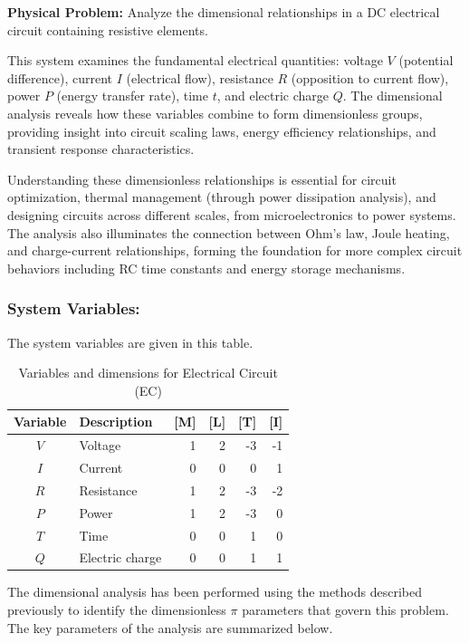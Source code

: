 \begin{problembox}
\textbf{Physical Problem:} Analyze the dimensional relationships in a DC electrical circuit containing resistive elements.
\end{problembox}
\begin{codebox}
This system examines the fundamental electrical quantities: voltage $V$ (potential difference), current $I$ (electrical flow), resistance $R$ (opposition to current flow), power $P$ (energy transfer rate), time $t$, and electric charge $Q$. The dimensional analysis reveals how these variables combine to form dimensionless groups, providing insight into circuit scaling laws, energy efficiency relationships, and transient response characteristics.

Understanding these dimensionless relationships is essential for circuit optimization, thermal management (through power dissipation analysis), and designing circuits across different scales, from microelectronics to power systems. The analysis also illuminates the connection between Ohm's law, Joule heating, and charge-current relationships, forming the foundation for more complex circuit behaviors including RC time constants and energy storage mechanisms.
\end{codebox}

\subsubsection*{System Variables: } The system variables are given in this table.

\begin{table}[htpb]
\centering
\begin{tabular}{|c|l|r|r|r|r|}
\hline
\textbf{Variable} & \textbf{Description} & \textbf{[M]} & \textbf{[L]} & \textbf{[T]} & \textbf{[I]} \\
\hline
$V$ & Voltage & 1 & 2 & -3 & -1 \\
$I$ & Current & 0 & 0 & 0 & 1 \\
$R$ & Resistance & 1 & 2 & -3 & -2 \\
$P$ & Power & 1 & 2 & -3 & 0 \\
$T$ & Time & 0 & 0 & 1 & 0 \\
$Q$ & Electric charge & 0 & 0 & 1 & 1 \\
\hline
\end{tabular}
\caption{Variables and dimensions for Electrical Circuit (EC)}
\end{table}

The dimensional analysis has been performed using the methods described previously to identify the dimensionless $\pi$ parameters that govern this problem. The key parameters of the analysis are summarized below.

